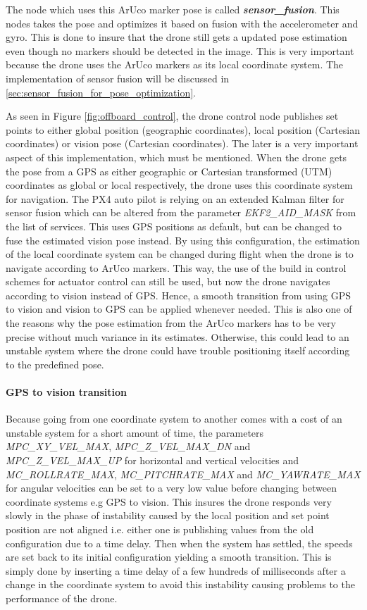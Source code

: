 \documentclass[../Head/report.tex]{subfiles}
\begin{document}
The node which uses this ArUco marker pose is called \textit{\textbf{sensor\_fusion}}. This nodes takes the pose and optimizes it based on fusion with the accelerometer and gyro. This is done to insure that the drone still gets a updated pose estimation even though no markers should be detected in the image. This is very important because the drone uses the ArUco markers as its local coordinate system. The implementation of sensor fusion will be discussed in \ref{sec:sensor_fusion_for_pose_optimization}.  

As seen in Figure \ref{fig:offboard_control}, the drone control node publishes set points to either global position (geographic coordinates), local position (Cartesian coordinates) or vision pose (Cartesian coordinates). The later is a very important aspect of this implementation, which must be mentioned. When the drone gets the pose from a GPS as either   geographic or Cartesian transformed (UTM) coordinates as global or local respectively, the drone uses this coordinate system for navigation. The PX4 auto pilot is relying on an extended Kalman filter for sensor fusion which can be altered from the parameter \textit{EKF2\_AID\_MASK} from the list of services. This uses GPS positions as default, but can be changed to fuse the estimated vision pose instead. By using this configuration, the estimation of the local coordinate system can be changed during flight when the drone is to navigate according to ArUco markers. This way, the use of the build in control schemes for actuator control can still be used, but now the drone navigates according to vision instead of GPS. Hence, a smooth transition from using GPS to vision and vision to GPS can be applied whenever needed. This is also one of the reasons why the pose estimation from the ArUco markers has to be very precise without much variance in its estimates. Otherwise, this could lead to an unstable system where the drone could have trouble positioning itself according to the predefined pose. 

\paragraph{GPS to vision transition}

Because going from one coordinate system to another comes with a cost of an unstable system for a short amount of time, the parameters \textit{MPC\_XY\_VEL\_MAX}, \textit{MPC\_Z\_VEL\_MAX\_DN} and  \textit{MPC\_Z\_VEL\_MAX\_UP} for horizontal and vertical velocities  and \textit{MC\_ROLLRATE\_MAX}, \textit{MC\_PITCHRATE\_MAX} and \textit{MC\_YAWRATE\_MAX} for angular velocities can be set to a very low value before changing between coordinate systems e.g GPS to vision. This insures the drone responds very slowly in the phase of instability caused by the local position and set point position are not aligned i.e. either one is publishing values from the old configuration due to a time delay. Then when the system has settled, the speeds are set back to its initial configuration yielding a smooth transition. This is simply done by inserting a time delay of a few hundreds of milliseconds after a change in the coordinate system to avoid this instability causing problems to the performance of the drone.
\end{document}
